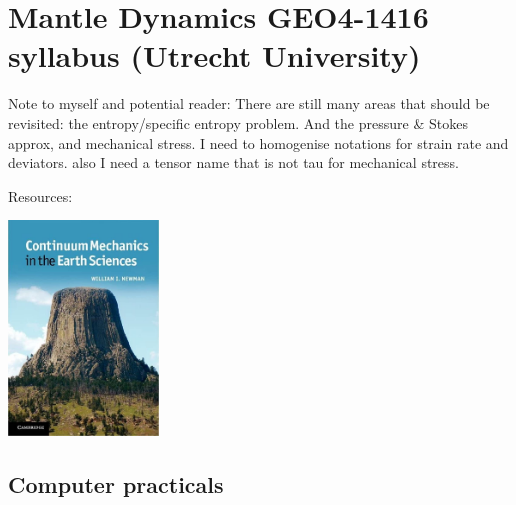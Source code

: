 \chapter{Mantle Dynamics GEO4-1416 syllabus (Utrecht University)} %

\begin{remark}
Note to myself and potential reader: 
There are still many areas that should be revisited: the entropy/specific entropy problem. 
And the pressure \& Stokes approx, and mechanical stress.  
I need to homogenise notations for strain rate and deviators.
also I need a tensor name that is not tau for mechanical stress.
\end{remark}

Resources:

\begin{center}
\includegraphics[width=4cm]{images/chapter_md/newman}\\
\end{center}




\newpage

\section{Computer practicals} 

